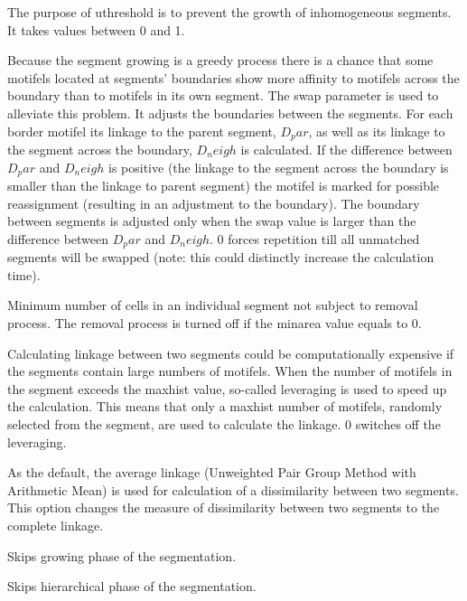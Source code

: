 The purpose of uthreshold is to prevent the growth of inhomogeneous segments.
It takes values between 0 and 1.


Because the segment growing is a greedy process there is a chance that some motifels located at segments’ boundaries show more affinity to motifels across the boundary than to motifels in its own segment.
The swap parameter is used to alleviate this problem.
It adjusts the boundaries between the segments.
For each border motifel its linkage to the parent segment, $D_par$, as well as its linkage to the segment across the boundary, $D_neigh$ is calculated.
If the difference between $D_par$ and $D_neigh$ is positive (the linkage to the segment across the boundary is smaller than the linkage to parent segment) the motifel is marked for possible reassignment (resulting in an adjustment to the boundary).
The boundary between segments is adjusted only when the swap value is larger than the difference between $D_par$ and $D_neigh$. 
0 forces repetition till all unmatched segments will be swapped (note: this could distinctly increase the calculation time).


Minimum number of cells in an individual segment not subject to removal process. 
The removal process is turned off if the minarea value equals to 0.


Calculating linkage between two segments could be computationally expensive if the segments contain large numbers of motifels.
When the number of motifels in the segment exceeds the maxhist value, so-called leveraging is used to speed up the calculation.
This means that only a maxhist number of motifels, randomly selected from the segment, are used to calculate the linkage.
0 switches off the leveraging.


As the default, the average linkage (Unweighted Pair Group Method with Arithmetic Mean) is used for calculation of a dissimilarity between two segments. 
This option changes the measure of dissimilarity between two segments to the complete linkage.


Skips growing phase of the segmentation.


Skips hierarchical phase of the segmentation.

